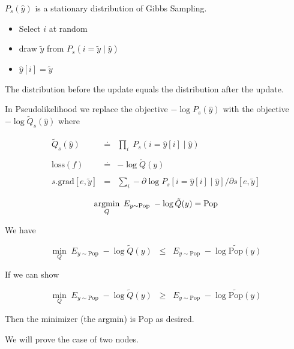 {

$P_s(\hat{y})$ is a stationary distribution of Gibbs Sampling.

\vfill
\begin{itemize}
\item   Select $i$ at random

\item draw $\tilde{y}$ from $P_s(i = \tilde{y} \;|\;\hat{y})$

\item $\hat{y}[i] = \tilde{y}$
\end{itemize}


\vfill
The distribution before the update equals the distribution after the update.


In Pseudolikelihood we replace the objective $- \log P_s(\hat{y})$ with the objective $- \log \tilde{Q}_s(\hat{y})$ where

\vfill
\begin{eqnarray*}
  \tilde{Q}_s(\hat{y}) & \doteq & \prod_i \;P_s(i = \hat{y}[i] \;|\;\hat{y}) \\
  \\
  \mathrm{loss}(f) & \doteq & - \log \tilde{Q}(y) \\
  \\
  s.\mathrm{grad}[e,\tilde{y}] & = & \sum_i - \partial \log P_s[i = \hat{y}[i] \;|\;\hat{y}] /\partial s[e,\tilde{y}]
\end{eqnarray*}



$$\operatorname*{argmin}_Q \; E_{y \sim \mathrm{Pop}} \;-\log \tilde{Q}(y) = \mathrm{Pop}$$

\vfill


We have

$$\min_{Q} \;E_{y \sim \mathrm{Pop}}\;-\log \tilde{Q}(y) \;\;\leq \;\; E_{y \sim \mathrm{Pop}}\;-\log \widetilde{\mathrm{Pop}}(y)$$

\vfill
If we can show

$$\min_{Q} \;E_{y \sim \mathrm{Pop}}\;-\log \tilde{Q}(y) \;\;\geq \;\; E_{y \sim \mathrm{Pop}}\;-\log \widetilde{\mathrm{Pop}}(y)$$

Then the minimizer (the argmin) is $\mathrm{Pop}$ as desired.


We will prove the case of two nodes.

}
